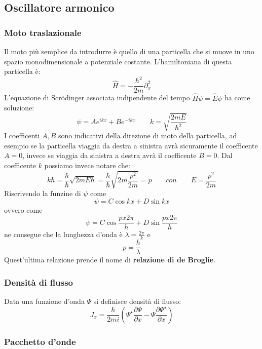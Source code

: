 \subsection{Oscillatore armonico}
\subsubsection{Moto traslazionale}
Il moto più semplice da introdurre è quello di una particella che si muove in uno spazio monodimensionale a potenziale costante. L'hamiltoniana di questa particella è:
$$\hat{H} = - \frac{\hbar^2}{2m} \partial_x^2$$
L'equazione di Scr\"odinger associata indipendente del tempo $\hat{H}\psi = \hat{E}\psi$ ha come soluzione:
$$\psi = A e^{i k x} + B e^{- i k x} \qquad k = \sqrt{\frac{2 m E}{\hbar^2}}$$
I coefficenti $A, B$ sono indicativi della direzione di moto della particella, ad esempio se la particella viaggia da destra a sinistra avrà sicuramente il coefficente $A = 0$, invece se viaggia da sinistra a destra avrà il coefficente $B = 0$.
Dal coefficente $k$ possiamo invece notare che:
$$k\hbar = \frac{\hbar}{\hbar} \sqrt{2 m E \hbar} = \frac{\hbar}{\hbar} \sqrt{2 m \frac{p^2}{2 m}} = p \qquad con \qquad E = \frac{p^2}{2m}$$
Riscrivendo la funzine di $\psi$ come
$$\psi = C \cos{kx} + D \sin{kx}$$
ovvero come
$$\psi = C \cos{\frac{p x 2 \pi}{h}} + D \sin{\frac{p x 2 \pi}{h}}$$
ne consegue che la lunghezza d'onda è $\lambda = \frac{2\pi}{k}$ e
$$p = \frac{h}{\lambda}$$
Quest'ultima relazione prende il nome di \textbf{relazione di de Broglie}.

\subsubsection{Densità di flusso}
Data una funzione d'onda $\Psi$ si definisce densità di flusso:
$$J_x = \frac{\hbar}{2mi}\left(\Psi^{\star} \frac{\partial \Psi}{\partial x} - \Psi \frac{\partial \Psi^{\star}}{\partial x}  \right)$$

\subsubsection{Pacchetto d'onde}

